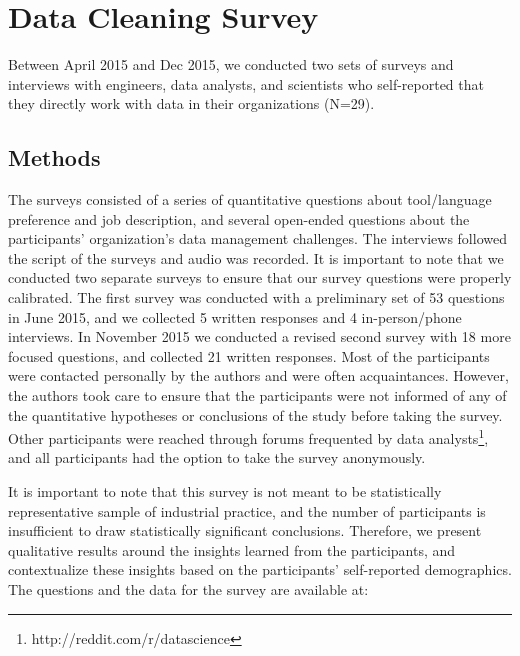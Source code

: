 \section{Data Cleaning Survey}
Between April 2015 and Dec 2015, we conducted two sets of surveys and interviews with engineers, data analysts, and scientists who self-reported that they directly work with data in their organizations (N=29).

\subsection{Methods}\label{sec:survey}
The surveys consisted of a series of quantitative questions about tool/language preference and job description, and several open-ended questions about the participants' organization's data management challenges. The interviews followed the script of the surveys and audio was recorded.
It is important to note that we conducted two separate surveys to ensure that our survey questions were properly calibrated.
The first survey was conducted with a preliminary set of 53 questions in June 2015, and we collected 5 written responses and 4 in-person/phone interviews.
In November 2015 we conducted a revised second survey with 18 more focused questions, and collected 21 written responses. 
Most of the participants were contacted personally by the authors and were often acquaintances.
However, the authors took care to ensure that the participants were not informed of any of the quantitative hypotheses or conclusions of the study before taking the survey. 
Other participants were reached through forums frequented by data analysts\footnote{http://reddit.com/r/datascience}, and all participants had the option to take the survey anonymously.

It is important to note that this survey is not meant to be statistically representative sample of industrial practice, and the number of participants is insufficient to draw statistically significant conclusions. Therefore, we present qualitative results around the insights learned from the participants, and contextualize these insights based on the participants' self-reported demographics.
The questions and the data for the survey are available at: 


